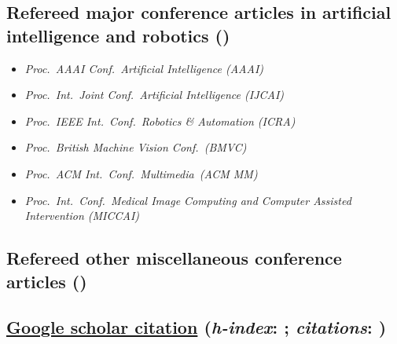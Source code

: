 \documentclass[9pt, a4paper]{article}
\begin{document}
\subsection*{Refereed major conference articles in artificial intelligence and robotics (\unskip)
}
{
\begin{itemize}
  \itemsep -.12cm
\footnotesize
\item \emph{  Proc.\ AAAI Conf.\ Artificial Intelligence (AAAI)}
\item \emph{  Proc.\ Int.\ Joint Conf.\ Artificial Intelligence (IJCAI)}
\item \emph{  Proc.\ IEEE Int.\ Conf.\  Robotics \&  Automation (ICRA)}
\item \emph{  Proc.\ British Machine Vision Conf.\ (BMVC)}
\item \emph{  Proc.\ ACM Int.\  Conf.\  Multimedia\ (ACM MM)}
\item \emph{  Proc.\ Int.\ Conf.\ Medical Image Computing and Computer Assisted Intervention (MICCAI)}

\end{itemize}
}




\noindent






\vspace{-0.15cm}
\subsection*{Refereed other miscellaneous  conference articles (\unskip)}
\noindent









\subsection*{\href{https://scholar.google.com/citations?hl=en&user=Ljk2BvIAAAAJ&view_op=list_works}{Google scholar citation} ({\it h-index}:  \unskip; {\it citations}: \unskip) }
\end{document}
